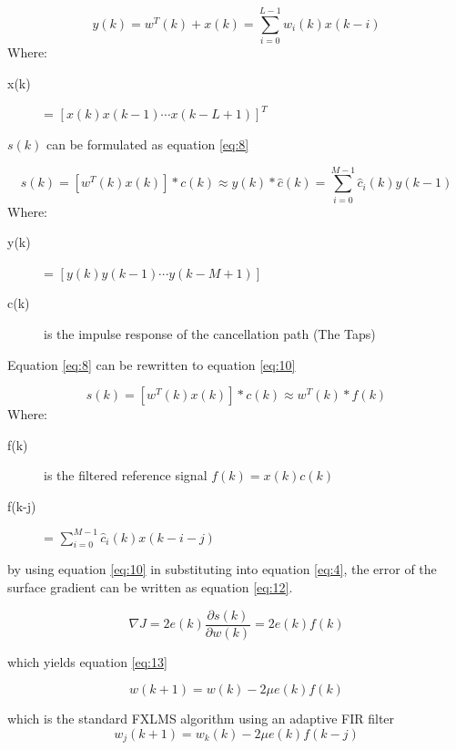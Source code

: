 \begin{equation}\label{eq:6}
y(k) = w^T(k) + x(k) = \sum_{i=0}^{L-1} w_i(k)x(k-i)
\end{equation}
Where:
\begin{description}
	\item[x(k)] = $[x(k) x(k-1) \cdots x(k-L+1)]^T $
\end{description}
$s(k)$ can be formulated as equation \ref{eq:8}

\begin{equation}\label{eq:8}
s(k) = [w^T(k)x(k)]*c(k)\approx y(k)*\hat{c}(k) = \sum_{i=0}^{M-1}\hat{c}_i(k)y(k-1)
\end{equation}
Where:
\begin{description}
	\item[y(k)] = $[ y(k) y(k-1) \cdots y(k-M+1)]$
	\item[c(k)] is the impulse response of the cancellation path (The Taps)
\end{description}

Equation \ref{eq:8} can be rewritten to equation \ref{eq:10}

\begin{equation}\label{eq:10}
s(k) = [w^T(k)x(k)]*c(k)\approx w^T(k)*f(k)
\end{equation}
Where:
\begin{description}
	\item[f(k)] is the filtered reference signal $f(k)=x(k)c(k)$
	\item[f(k-j)] = $\sum_{i=0}^{M-1}\hat{c}_i(k)x(k-i-j)$
\end{description}

by using equation \ref{eq:10} in substituting into equation \ref{eq:4}, the error of the surface gradient can be written as equation \ref{eq:12}.

\begin{equation}\label{eq:12}
\nabla J = 2e(k)\frac{\partial s(k)}{\partial w(k)} = 2e(k)f(k)
\end{equation}

which yields equation \ref{eq:13}

\begin{equation}\label{eq:13}
w(k+1) = w(k) - 2\mu e(k)f(k)
\end{equation}

which is the standard FXLMS algorithm using an adaptive FIR filter
\begin{equation}\label{eq:14}
w_j(k+1) = w_k(k) - 2\mu e(k)f(k-j)
\end{equation}
